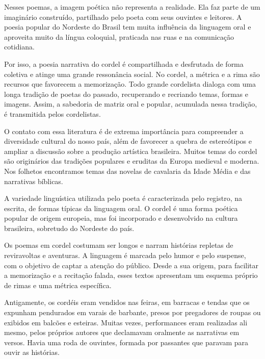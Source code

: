 \documentclass[12pt]{extarticle}
\begin{document}
Nesses poemas, a imagem poética não representa a realidade. Ela faz parte de um
imaginário construído, partilhado pelo poeta com seus ouvintes e leitores.
A poesia popular do Nordeste do Brasil tem muita influência da linguagem oral
e aproveita muito da língua coloquial, praticada nas ruas e na comunicação
cotidiana.

Por isso, a poesia narrativa do cordel é compartilhada e desfrutada de forma
coletiva e atinge uma grande ressonância social. No cordel, a métrica e a rima
são recursos que favorecem a memorização. Todo grande cordelista dialoga com
uma longa tradição de poetas do passado, recuperando e recriando temas, formas
e imagens. Assim, a sabedoria de matriz oral e popular, acumulada nessa
tradição, é transmitida pelos cordelistas. 

O contato com essa literatura é de extrema importância para compreender
a diversidade cultural do nosso país, além de favorecer a quebra de
estereótipos e ampliar a discussão sobre a produção artística brasileira.
Muitos temas do cordel são originários das tradições populares e eruditas da
Europa medieval e moderna. Nos folhetos encontramos temas das novelas de
cavalaria da Idade Média e das narrativas bíblicas.

A variedade linguística utilizada pelo poeta é caracterizada pelo registro, na
escrita, de formas típicas da linguagem oral. O cordel é uma forma poética
popular de origem europeia, mas foi incorporado e desenvolvido na cultura
brasileira, sobretudo do Nordeste do país.


Os poemas em cordel costumam ser longos e narram histórias repletas de
reviravoltas e aventuras. A linguagem é marcada pelo humor e pelo suspense, com
o objetivo de captar a atenção do público. Desde a sua origem, para facilitar
a memorização e a recitação falada, esses textos apresentam um esquema próprio
de rimas e uma métrica específica. 

Antigamente, os cordéis eram vendidos nas feiras, em barracas e tendas que os
expunham pendurados em varais de barbante, presos por pregadores de roupas ou
exibidos em balcões e esteiras. Muitas vezes, performances eram realizadas ali
mesmo, pelos próprios autores que declamavam oralmente as narrativas em versos.
Havia uma roda de ouvintes, formada por passantes que paravam para ouvir as
histórias.
\end{document}
